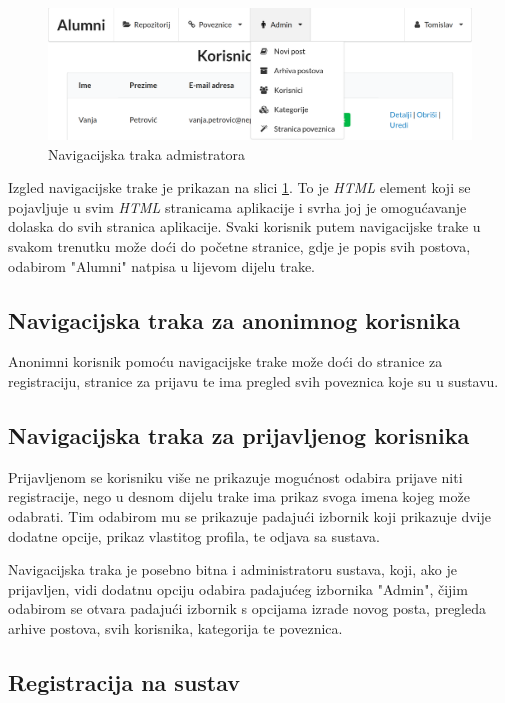 \documentclass[zavrsni, numeric]{fer}
\begin{document}
\begin{figure}[H]
	\centering
	\includegraphics[width=13cm]{slike/nav-admin.png}
	\caption{Navigacijska traka admistratora}
	\label{fig:nav-admin}
\end{figure}

Izgled navigacijske trake je prikazan na slici \ref{fig:nav-admin}. To je \textit{HTML} element koji se pojavljuje u svim \textit{HTML} stranicama aplikacije i svrha joj je omogućavanje dolaska do svih stranica aplikacije. Svaki korisnik putem navigacijske trake u svakom trenutku može doći do početne stranice, gdje je popis svih postova, odabirom "Alumni" natpisa u lijevom dijelu trake. 

\subsection{Navigacijska traka za anonimnog korisnika}
Anonimni korisnik pomoću navigacijske trake može doći do stranice za registraciju, stranice za prijavu te ima pregled svih poveznica koje su u sustavu. 

\subsection{Navigacijska traka za prijavljenog korisnika}
Prijavljenom se korisniku više ne prikazuje mogućnost odabira prijave niti registracije, nego u desnom dijelu trake ima prikaz svoga imena kojeg može odabrati. Tim odabirom mu se prikazuje padajući izbornik koji prikazuje dvije dodatne opcije, prikaz vlastitog profila, te odjava sa sustava.

Navigacijska traka je posebno bitna i administratoru sustava, koji, ako je prijavljen, vidi dodatnu opciju odabira padajućeg izbornika "Admin", čijim odabirom se otvara padajući izbornik s opcijama izrade novog posta, pregleda arhive postova, svih korisnika, kategorija te poveznica.

\subsection{Registracija na sustav}
\end{document}
